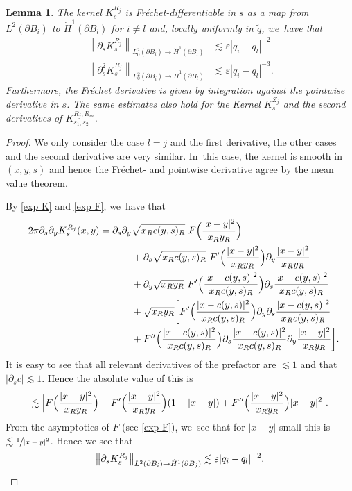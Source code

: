 \documentclass[10pt]{amsart}
\let\epsilon\varepsilon
\newtheorem{lemma}[theorem]{Lemma}
\theoremstyle{definition}
\newcommand\norm[1]{\left\lVert #1\right\rVert}
\newcommand\eq{=}
\let\de\partial
\let\eps\epsilon
\begin{document}
\begin{lemma}\label{deri K 2}
The kernel $K_s^{R_j}$ is Fréchet-differentiable in $s$ as a map from $L^2(\de B_i)$ to $\dot{H}^1(\de B_l)$ for $i\neq l$ and, locally uniformly in $\tilde{q}$, we~have that
\begin{align*}
\norm{\de_s K_s^{R_j}}_{L_0^2(\de B_i)\to \dot{H}^1(\de B_l)}&\lesssim \eps|q_i-q_l|^{-2}\\
\tag*{and}
\norm{\de_s^2 K_s^{R_j}}_{L_0^2(\de B_i)\to \dot{H}^1(\de B_l)}&\lesssim \eps|q_i-q_l|^{-3}.
\end{align*}
Furthermore, the Fréchet derivative is given by integration against the pointwise derivative in $s$. The same estimates also hold for the Kernel $K_s^{Z_j}$ and the second derivatives of $K_{s_1,s_2}^{R_j,R_m}$.
\end{lemma}
\begin{proof}
We only consider the case $l=j$ and the first derivative, the other cases and the second derivative are very similar. In~this case, the kernel is smooth in $(x,y,s)$ and hence the Fréchet- and pointwise derivative agree by \eg the mean value theorem.

By \eqref{exp K} and \eqref{exp F}, we~have that
\begin{align*}
-2\pi\de_s\de_yK_s^{R_j}(x,y)\eq \de_s\de_y&\sqrt{x_Rc(y,s)_R}\,\,F\Bigl(\frac{|x-y|^2}{x_Ry_R}\Bigr)\\
&+\de_s\sqrt{x_Rc(y,s)_R}\,\,F'\Bigl(\frac{|x-y|^2}{x_Ry_R}\Bigr)\de_y\frac{|x-y|^2}{x_Ry_R}\\
&+\de_y\sqrt{x_Ry_R}\,\,F'\Bigl(\frac{|x-c(y,s)|^2}{x_Rc(y,s)_R}\Bigr)\de_s\frac{|x-c(y,s)|^2}{x_Rc(y,s)_R}\\
&+\sqrt{x_Ry_R}\biggl[F'\Bigl(\frac{|x-c(y,s)|^2}{x_Rc(y,s)_R}\Bigr)\de_y\de_s\frac{|x-c(y,s)|^2}{x_Rc(y,s)_R}\\
&+F''\Bigl(\frac{|x-c(y,s)|^2}{x_Rc(y,s)_R}\Bigr)\de_s\frac{|x-c(y,s)|^2}{x_Rc(y,s)_R}\de_y\frac{|x-y|^2}{x_Ry_R}\biggr].
\end{align*}
It is easy to see that all relevant derivatives of the prefactor are $\lesssim 1$ and that $|\de_s c|\lesssim 1$. Hence the absolute value of this is
\begin{align*}
\lesssim \Bigl |F \Bigl(\frac{|x-y|^2}{x_Ry_R} \Bigr)+F'\Bigl(\frac{|x-y|^2}{x_Ry_R} \Bigr)(1+|x-y|)+F''\Bigl(\frac{|x-y|^2}{x_Ry_R} \Bigr)|x-y|^2 \Bigr|.
\end{align*}
From the asymptotics of $F$ (see \eqref{exp F}), we~see that for $|x-y|$ small this is $\lesssim \sfrac{1}{|x-y|^2}$.
Hence we see that
\[
\norm{\de_sK_s^{R_j}}_{L^2(\de B_i)\to \dot{H}^1(\de B_j)}\lesssim \eps |q_i-q_l|^{-2}.\qedhere
\]
\end{proof}
\end{document}
